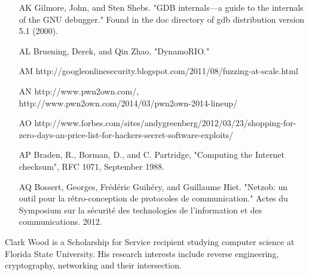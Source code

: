 \documentclass[11pt,expanded,copyright]{fsuthesis}
\begin{document}
\begin{itemize}
	\item [AK] Gilmore, John, and Sten Shebs. "GDB internals—a guide to the internals of the GNU debugger." Found in the doc directory of gdb distribution version 5.1 (2000).
	\item [AL] Bruening, Derek, and Qin Zhao. "DynamoRIO."	
	\item [AM] http://googleonlinesecurity.blogspot.com/2011/08/fuzzing-at-scale.html
	\item [AN] http://www.pwn2own.com/, http://www.pwn2own.com/2014/03/pwn2own-2014-lineup/
	\item [AO] http://www.forbes.com/sites/andygreenberg/2012/03/23/shopping-for-zero-days-an-price-list-for-hackers-secret-software-exploits/
	\item [AP] Braden, R., Borman, D., and C. Partridge, "Computing the Internet checksum", RFC 1071, September 1988.
	\item [AQ] Bossert, Georges, Frédéric Guihéry, and Guillaume Hiet. "Netzob: un outil pour la rétro-conception de protocoles de communication." Actes du Symposium sur la sécurité des technologies de l'information et des communications. 2012.

\end{itemize}


%
%

%





% 
% 

\begin{biosketch}
Clark Wood is a Scholarship for Service recipient studying computer science at Florida State University. His research interests include reverse engineering, cryptography, networking and their intersection.
\end{biosketch}
\end{document}
